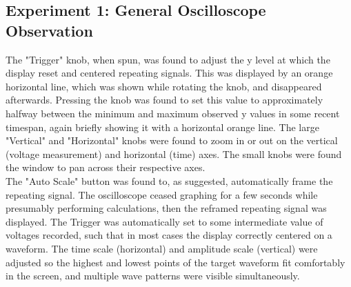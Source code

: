 \documentclass[12pt]{article}
\begin{document}
\subsection{Experiment 1: General Oscilloscope Observation}
The "Trigger" knob, when spun, was found to adjust the y level at which the display reset and centered repeating signals.
This was displayed by an orange horizontal line, which was shown while rotating the knob, and disappeared afterwards.
Pressing the knob was found to set this value to approximately halfway between the minimum and maximum observed y values in some recent timespan, again briefly showing it with a horizontal orange line.
The large "Vertical" and "Horizontal" knobs were found to zoom in or out on the vertical (voltage measurement) and horizontal (time) axes. 
The small knobs were found the window to pan across their respective axes.\\
The "Auto Scale" button was found to, as suggested, automatically frame the repeating signal.
The oscilloscope ceased graphing for a few seconds while presumably performing calculations, then the reframed repeating signal was displayed.
The Trigger was automatically set to some intermediate value of voltages recorded, such that in most cases the display correctly centered on a waveform.
The time scale (horizontal) and amplitude scale (vertical) were adjusted so the highest and lowest points of the target waveform fit comfortably in the screen, and multiple wave patterns were visible simultaneously.
\end{document}

